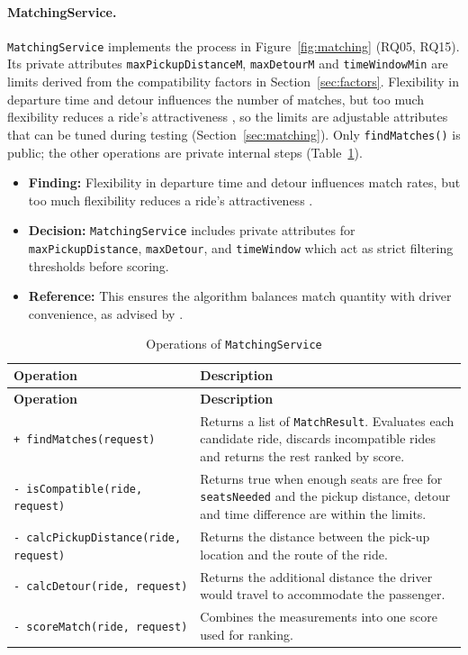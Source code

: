 \paragraph{MatchingService.} \texttt{MatchingService} implements the process in Figure~\ref{fig:matching} (RQ05, RQ15). Its private attributes \texttt{maxPickupDistanceM}, \texttt{maxDetourM} and \texttt{timeWindowMin} are limits derived from the compatibility factors in Section~\ref{sec:factors}. Flexibility in departure time and detour influences the number of matches, but too much flexibility reduces a ride's attractiveness \citep{stiglic2016}, so the limits are adjustable attributes that can be tuned during testing (Section~\ref{sec:matching}). Only \texttt{findMatches()} is public; the other operations are private internal steps (Table~\ref{tab:matchingops}).

\begin{itemize}
  \item \textbf{Finding:} Flexibility in departure time and detour influences match rates, but too much flexibility reduces a ride's attractiveness \citep{stiglic2016}.
  \item \textbf{Decision:} \texttt{MatchingService} includes private attributes for \texttt{maxPickupDistance}, \texttt{maxDetour}, and \texttt{timeWindow} which act as strict filtering thresholds before scoring.
  \item \textbf{Reference:} This ensures the algorithm balances match quantity with driver convenience, as advised by \citet{stiglic2016}.
\end{itemize}

\begingroup\small
\begin{longtable}{@{}>{\raggedright\arraybackslash}p{}
                   >{\raggedright\arraybackslash}p{}@{}}
\caption{Operations of \texttt{MatchingService}}\label{tab:matchingops}\\
\toprule
\textbf{Operation} & \textbf{Description} \\
\midrule
\endfirsthead
\toprule
\textbf{Operation} & \textbf{Description} \\
\midrule
\endhead
\bottomrule
\endfoot
\texttt{+ findMatches(request)} & Returns a list of \texttt{MatchResult}. Evaluates each candidate ride, discards incompatible rides and returns the rest ranked by score. \\
\texttt{- isCompatible(ride, request)} & Returns true when enough seats are free for \texttt{seatsNeeded} and the pickup distance, detour and time difference are within the limits. \\
\texttt{- calcPickupDistance(ride, request)} & Returns the distance between the pick-up location and the route of the ride. \\
\texttt{- calcDetour(ride, request)} & Returns the additional distance the driver would travel to accommodate the passenger. \\
\texttt{- scoreMatch(ride, request)} & Combines the measurements into one score used for ranking. \\
\end{longtable}
\endgroup

